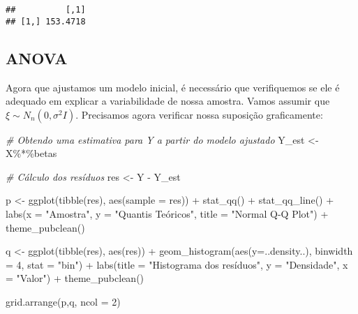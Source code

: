 \documentclass[
]{article}
\newenvironment{Shaded}{\begin{snugshade}}{\end{snugshade}}
\newcommand{\AttributeTok}[1]{\textcolor[rgb]{0.77,0.63,0.00}{#1}}
\newcommand{\CommentTok}[1]{\textcolor[rgb]{0.56,0.35,0.01}{\textit{#1}}}
\newcommand{\DecValTok}[1]{\textcolor[rgb]{0.00,0.00,0.81}{#1}}
\newcommand{\FunctionTok}[1]{\textcolor[rgb]{0.00,0.00,0.00}{#1}}
\newcommand{\NormalTok}[1]{#1}
\newcommand{\OtherTok}[1]{\textcolor[rgb]{0.56,0.35,0.01}{#1}}
\newcommand{\SpecialCharTok}[1]{\textcolor[rgb]{0.00,0.00,0.00}{#1}}
\newcommand{\StringTok}[1]{\textcolor[rgb]{0.31,0.60,0.02}{#1}}
\begin{document}
\begin{verbatim}
##          [,1]
## [1,] 153.4718
\end{verbatim}

\hypertarget{anova}{%
\subsection{ANOVA}\label{anova}}

Agora que ajustamos um modelo inicial, é necessário que verifiquemos se
ele é adequado em explicar a variabilidade de nossa amostra. Vamos
assumir que \(\xi\sim N_n(0,\sigma^2I)\). Precisamos agora verificar
nossa suposição graficamente:

\begin{Shaded}
\begin{Highlighting}[]
\CommentTok{\# Obtendo uma estimativa para Y a partir do modelo ajustado}
\NormalTok{Y\_est }\OtherTok{\textless{}{-}}\NormalTok{ X}\SpecialCharTok{\%*\%}\NormalTok{betas}

\CommentTok{\# Cálculo dos resíduos}
\NormalTok{res }\OtherTok{\textless{}{-}}\NormalTok{ Y }\SpecialCharTok{{-}}\NormalTok{ Y\_est}
\end{Highlighting}
\end{Shaded}

\begin{Shaded}
\begin{Highlighting}[]
\NormalTok{p }\OtherTok{\textless{}{-}} \FunctionTok{ggplot}\NormalTok{(}\FunctionTok{tibble}\NormalTok{(res), }\FunctionTok{aes}\NormalTok{(}\AttributeTok{sample =}\NormalTok{ res)) }\SpecialCharTok{+} \FunctionTok{stat\_qq}\NormalTok{() }\SpecialCharTok{+} \FunctionTok{stat\_qq\_line}\NormalTok{() }\SpecialCharTok{+}
  \FunctionTok{labs}\NormalTok{(}\AttributeTok{x =} \StringTok{"Amostra"}\NormalTok{,}
       \AttributeTok{y =} \StringTok{"Quantis Teóricos"}\NormalTok{,}
       \AttributeTok{title =} \StringTok{"Normal Q{-}Q Plot"}\NormalTok{) }\SpecialCharTok{+}
  \FunctionTok{theme\_pubclean}\NormalTok{()}

\NormalTok{q }\OtherTok{\textless{}{-}} \FunctionTok{ggplot}\NormalTok{(}\FunctionTok{tibble}\NormalTok{(res), }\FunctionTok{aes}\NormalTok{(res)) }\SpecialCharTok{+}
  \FunctionTok{geom\_histogram}\NormalTok{(}\FunctionTok{aes}\NormalTok{(}\AttributeTok{y=}\NormalTok{..density..), }\AttributeTok{binwidth =} \DecValTok{4}\NormalTok{, }\AttributeTok{stat =} \StringTok{"bin"}\NormalTok{) }\SpecialCharTok{+}
  \FunctionTok{labs}\NormalTok{(}\AttributeTok{title =} \StringTok{"Histograma dos resíduos"}\NormalTok{,}
       \AttributeTok{y =} \StringTok{"Densidade"}\NormalTok{,}
       \AttributeTok{x =} \StringTok{"Valor"}\NormalTok{) }\SpecialCharTok{+}
  \FunctionTok{theme\_pubclean}\NormalTok{()}

\FunctionTok{grid.arrange}\NormalTok{(p,q, }\AttributeTok{ncol =} \DecValTok{2}\NormalTok{)}
\end{Highlighting}
\end{Shaded}
\end{document}
